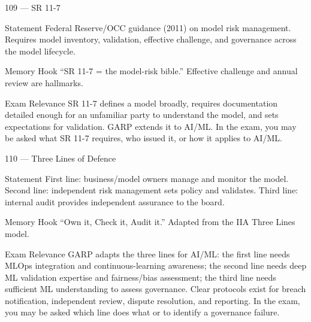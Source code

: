 \documentclass[aspectratio=169,8pt]{beamer}
\begin{document}
	\begin{frame}{109 --- SR 11-7}
		\begin{block}{Statement}
			Federal Reserve/OCC guidance (2011) on model risk management. Requires model inventory, validation, effective challenge, and governance across the model lifecycle.
		\end{block}
		\begin{block}{Memory Hook}
			``SR 11-7 = the model-risk bible.'' Effective challenge and annual review are hallmarks.
		\end{block}
		\begin{block}{Exam Relevance}
			SR 11-7 defines a model broadly, requires documentation detailed enough for an unfamiliar party to understand the model, and sets expectations for validation. GARP extends it to AI/ML. In the exam, you may be asked what SR 11-7 requires, who issued it, or how it applies to AI/ML.
		\end{block}
	\end{frame}
	
	\begin{frame}{110 --- Three Lines of Defence}
		\begin{block}{Statement}
			First line: business/model owners manage and monitor the model. Second line: independent risk management sets policy and validates. Third line: internal audit provides independent assurance to the board.
		\end{block}
		\begin{block}{Memory Hook}
			``Own it, Check it, Audit it.'' Adapted from the IIA Three Lines model.
		\end{block}
		\begin{block}{Exam Relevance}
			GARP adapts the three lines for AI/ML: the first line needs MLOps integration and continuous-learning awareness; the second line needs deep ML validation expertise and fairness/bias assessment; the third line needs sufficient ML understanding to assess governance. Clear protocols exist for breach notification, independent review, dispute resolution, and reporting. In the exam, you may be asked which line does what or to identify a governance failure.
		\end{block}
	\end{frame}
	
\end{document}
